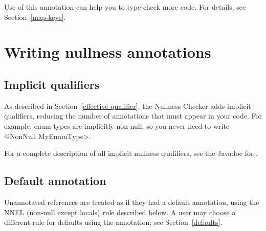 Use of this annotation can help you to type-check more code.  For details,
see Section~\ref{map-keys}.


\section{Writing nullness annotations\label{writing-nullness-annotations}}

\subsection{Implicit qualifiers\label{nullness-implicit-qualifiers}}

As described in Section~\ref{effective-qualifier}, the Nullness Checker
adds implicit qualifiers, reducing the number of annotations that must
appear in your code.
For example, enum types are implicitly non-null, so you never need to write
\<@NonNull MyEnumType>.

For a complete description of all implicit nullness qualifiers, see the
Javadoc for .



\subsection{Default annotation\label{null-defaults}}

Unannotated references are treated as if they had a default annotation,
using the NNEL (non-null except locals) rule described below.
A user may choose a different rule for defaults using the
 annotation; see
Section~\ref{defaults}.


